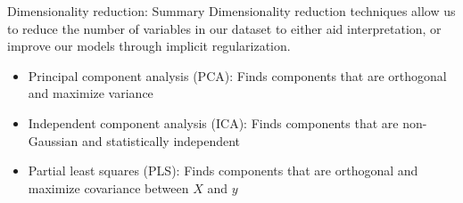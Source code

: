 \begin{frame}{Dimensionality reduction: Summary}
    Dimensionality reduction techniques allow us to reduce the number of variables in our dataset to either aid interpretation, or improve our models through implicit regularization.
    \begin{itemize}
        \item Principal component analysis (PCA): Finds components that are orthogonal and maximize variance
        \item Independent component analysis (ICA): Finds components that are non-Gaussian and statistically independent
        \item Partial least squares (PLS): Finds components that are orthogonal and maximize covariance between $X$ and $y$
    \end{itemize}
\end{frame}
